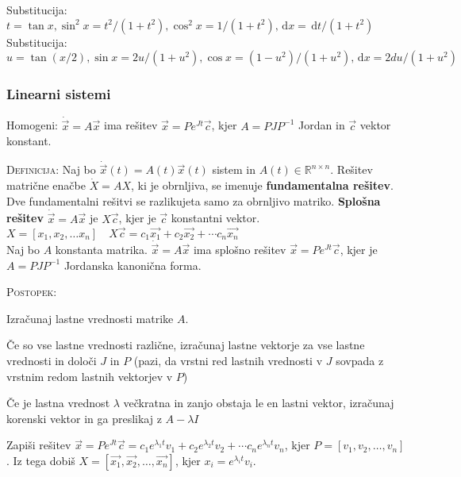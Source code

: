 \documentclass[a4paper,10pt]{article}
\theoremstyle{definition}
\def\R{\mathbb{R}}
\newenvironment{itemize*}%
{
\vspace{-6pt}
\begin{itemize}
\setlength{\itemsep}{0pt}
\setlength{\parskip}{1pt}
}
{\end{itemize}}
\newenvironment{enumerate*}%
{
\vspace{-6pt}
\begin{enumerate}
\setlength{\itemsep}{0pt}
\setlength{\parskip}{1pt}
}
{\end{enumerate}}
\newcommand{\dx}{\ensuremath{\,\mathrm{d}x}}
\newcommand{\dt}{\ensuremath{\,\mathrm{d}t}}
\begin{document}
Substitucija: $t = \tan x, \sin^2 x = t^2 /(1 + t^2), \cos^2 x = 1/(1 + t^2), \dx = \dt/(1 + t^2)$\\
Substitucija: $u = \tan (x/2), \sin x = 2 u /(1 + u^2), \cos x = (1-u^2)/(1 + u^2), \dx = 2 du/(1 + u^2)$\\

\newpage


\subsubsection*{Linearni sistemi}
Homogeni: $\dot{\vec{x}} = A \vec{x}$ ima rešitev $\vec{x} = P e^{Jt} \vec{c}$, kjer $A = P J P^{-1}$ Jordan in $\vec{c}$ vektor konstant.

\textsc{Definicija: }Naj bo $\dot{\vec{x}}(t) = A(t) \vec{x}(t)$ sistem in
$A(t) \in \R^{n \times n}$. Rešitev matrične enačbe $\dot{X} = AX$, ki je obrnljiva, se
imenuje \textbf{fundamentalna rešitev}. Dve fundamentalni rešitvi se
razlikujeta samo za obrnljivo matriko. \textbf{Splošna rešitev} $\dot{\vec{x}}
= A \vec{x}$ je $X\vec{c}$, kjer je $\vec{c}$ konstantni vektor. \\

$X = [x_1,x_2,\ldots x_n] \quad  X\vec{c} = c_1\vec{x_1} + c_2\vec{x_2} + \cdots c_n\vec{x_n}$ \\

Naj bo $A$ konstanta matrika. $\dot{\vec{x}} = A \vec{x}$ ima splošno rešitev
$\vec{x} = Pe^{Jt}\vec{c}$, kjer je $A=PJP^{-1}$ Jordanska kanonična forma.

\textsc{Postopek:}
\begin{enumerate*}
  \item Izračunaj lastne vrednosti
    matrike $A$.
    \begin{itemize*}
      \item Če so vse lastne vrednosti različne,
        izračunaj lastne vektorje za vse lastne vrednosti in določi $J$ in $P$ (pazi,
        da vrstni red lastnih vrednosti v $J$ sovpada z vrstnim redom lastnih vektorjev
        v $P$)
      \item Če je lastna vrednost $\lambda$ večkratna in zanjo obstaja le en
        lastni vektor, izračunaj korenski vektor in ga preslikaj z $A-\lambda I$
    \end{itemize*}
  \item Zapiši rešitev $\vec{x} = Pe^{Jt}\vec{c} = c_1
    e^{\lambda_1t} v_1 + c_2 e^{\lambda_2t} v_2 + \cdots c_n e^{\lambda_nt} v_n$,
    kjer $P = [v_1,v_2,\ldots ,v_n]$. Iz tega dobiš $X = [\vec{x_1},\vec{x_2},
    \ldots, \vec{x_n}]$, kjer $x_i = e^{\lambda_it} v_i$.
\end{enumerate*}
\end{document}
